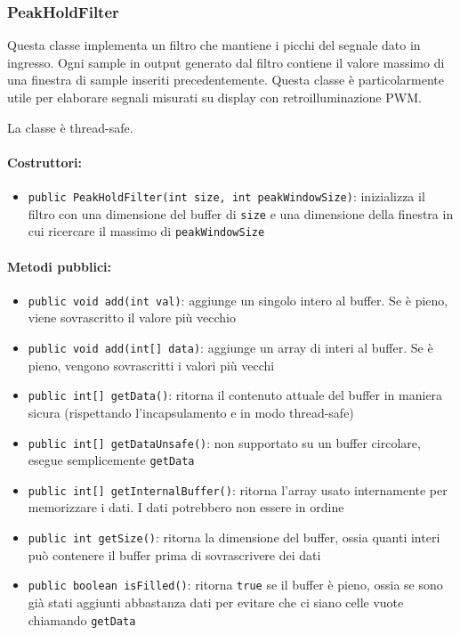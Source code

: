\subsubsection{PeakHoldFilter}
Questa classe implementa un filtro che mantiene i picchi del segnale dato in ingresso. Ogni sample in output generato dal filtro contiene il valore massimo di una finestra di sample inseriti precedentemente. Questa classe è particolarmente utile per elaborare segnali misurati su display con retroilluminazione PWM.

La classe è thread-safe.

\paragraph{Costruttori:}\begin{itemize}
	\item \texttt{public PeakHoldFilter(int size, int peakWindowSize)}: inizializza il filtro con una dimensione del buffer di \texttt{size} e una dimensione della finestra in cui ricercare il massimo di \texttt{peakWindowSize}
\end{itemize}

\paragraph{Metodi pubblici:}\begin{itemize}
	\item \texttt{public void add(int val)}: aggiunge un singolo intero al buffer. Se è pieno, viene sovrascritto il valore più vecchio
	\item \texttt{public void add(int[] data)}: aggiunge un array di interi al buffer. Se è pieno, vengono sovrascritti i valori più vecchi
	\item \texttt{public int[] getData()}: ritorna il contenuto attuale del buffer in maniera sicura (rispettando l'incapsulamento e in modo thread-safe)
	\item \texttt{public int[] getDataUnsafe()}: non supportato su un buffer circolare, esegue semplicemente \texttt{getData}
	\item \texttt{public int[] getInternalBuffer()}: ritorna l'array usato internamente per memorizzare i dati. I dati potrebbero non essere in ordine
	\item \texttt{public int getSize()}: ritorna la dimensione del buffer, ossia quanti interi può contenere il buffer prima di sovrascrivere dei dati
	\item \texttt{public boolean isFilled()}: ritorna \texttt{true} se il buffer è pieno, ossia se sono già stati aggiunti abbastanza dati per evitare che ci siano celle vuote chiamando \texttt{getData}
\end{itemize}

